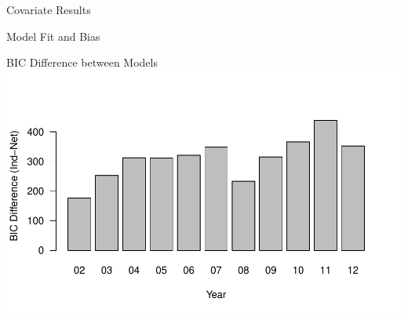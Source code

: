 \documentclass{beamer}
\begin{document}
\begin{frame}{Covariate Results}

\end{frame}

\begin{frame}{Model Fit and Bias}


    \centering
    BIC Difference between Models\\
\includegraphics[scale=.6]{slides_figures/BICdiff.pdf}  



\end{frame}
\end{document}
